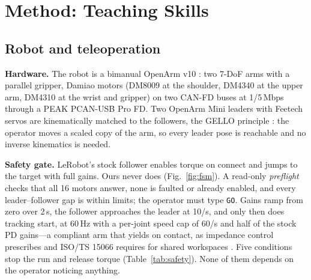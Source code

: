 \documentclass[10pt,twocolumn,letterpaper]{article}
\newcommand{\code}[1]{\texttt{\small #1}}
\begin{document}
\section{Method: Teaching Skills}
\subsection{Robot and teleoperation}\label{sec:teleop}
\textbf{Hardware.} The robot is a bimanual OpenArm v10 \citep{enactic2025openarm}: two 7-DoF arms with a parallel
gripper, Damiao motors (DM8009 at the shoulder, DM4340 at the upper arm, DM4310 at the wrist and gripper) on two
CAN-FD buses at 1/5\,Mbps through a PEAK PCAN-USB Pro FD. Two OpenArm Mini leaders with Feetech servos are
kinematically matched to the followers, the GELLO principle \citep{wu2024gello}: the operator moves a scaled copy
of the arm, so every leader pose is reachable and no inverse kinematics is needed.

\textbf{Safety gate.} LeRobot's stock follower enables torque on connect and jumps to the target with full gains. Ours
never does (Fig.~\ref{fig:fsm}). A read-only \emph{preflight} checks that all 16 motors answer, none is faulted or
already enabled, and every leader--follower gap is within limits; the operator must type \code{GO}. Gains ramp from
zero over 2\,s, the follower approaches the leader at 10\textdegree/s, and only then does tracking start, at 60\,Hz
with a per-joint speed cap of 60\textdegree/s and half of the stock PD gains---a compliant arm that yields on contact,
as impedance control prescribes \citep{hogan1985impedance} and ISO/TS 15066 requires for shared workspaces
\citep{iso15066}. Five conditions stop the run and release torque (Table~\ref{tab:safety}). None of them depends on the
operator noticing anything.
\end{document}
